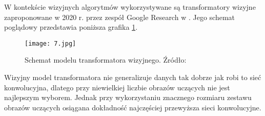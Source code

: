 W kontekście wizyjnych algorytmów wykorzystywane są transformatory wizyjne zaproponowane w 2020 r. przez zespół Google Research w \cite{dosovitskiy2020}. Jego schemat poglądowy przedstawia poniższa grafika \ref{fig:schemat-vit}.
\begin{figure}[H]
    \centering
    \texttt{[image: 7.jpg]}
    \caption{Schemat modelu transformatora wizyjnego. Źródło: \cite{dosovitskiy2020}}
    \label{fig:schemat-vit}
\end{figure}
Wizyjny model transformatora nie generalizuje danych tak dobrze jak robi to sieć konwolucyjna, dlatego przy niewielkiej liczbie obrazów uczących nie jest najlepszym wyborem. Jednak przy wykorzystaniu znacznego rozmiaru zestawu obrazów uczących osiągana dokładność najczęściej przewyższa sieci konwolucyjne.